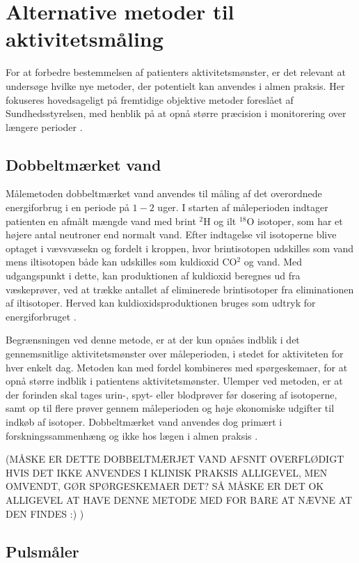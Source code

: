\section{Alternative metoder til aktivitetsmåling}

For at forbedre bestemmelsen af patienters aktivitetsmønster, er det relevant at undersøge hvilke nye metoder, der potentielt kan anvendes i almen praksis. Her fokuseres hovedsageligt på fremtidige objektive metoder foreslået af Sundhedsstyrelsen, med henblik på at opnå større præcision i monitorering over længere perioder \citep{motionsraad2007}.

\subsection{Dobbeltmærket vand}

Målemetoden dobbeltmærket vand anvendes til måling af det overordnede energiforbrug i en periode på $1-2$ uger. I starten af måleperioden indtager patienten en afmålt mængde vand med brint  $^2$H og ilt $^{18}$O isotoper, som har et højere antal neutroner end normalt vand. Efter indtagelse vil isotoperne blive optaget i vævsvæsekn og fordelt i kroppen, hvor brintisotopen udskilles som vand mens iltisotopen både kan udskilles som kuldioxid CO$^2$ og vand. Med udgangspunkt i dette, kan produktionen af kuldioxid beregnes ud fra væskeprøver, ved at trække antallet af eliminerede brintisotoper fra eliminationen af iltisotoper. Herved kan kuldioxidsproduktionen bruges som udtryk for energiforbruget \citep{motionsraad2007,pedersen2011}.

Begrænsningen ved denne metode, er at der kun opnåes indblik i det gennemsnitlige aktivitetsmønster over måleperioden, i stedet for aktiviteten for hver enkelt dag. Metoden kan med fordel kombineres med spørgeskemaer, for at opnå større indblik i patientens aktivitetsmønster. 
Ulemper ved metoden, er at der forinden skal tages urin-, spyt- eller blodprøver før dosering af isotoperne, samt op til flere prøver gennem måleperioden og høje økonomiske udgifter til indkøb af isotoper. Dobbeltmærket vand anvendes dog primært i forskningssammenhæng og ikke hos lægen i almen praksis \citep{motionsraad2007}.

(MÅSKE ER DETTE DOBBELTMÆRJET VAND AFSNIT OVERFLØDIGT HVIS DET IKKE ANVENDES I KLINISK PRAKSIS ALLIGEVEL, MEN OMVENDT, GØR SPØRGESKEMAER DET? SÅ MÅSKE ER DET OK ALLIGEVEL AT HAVE DENNE METODE MED FOR BARE AT NÆVNE AT DEN FINDES :) ) 

\subsection{Pulsmåler}

